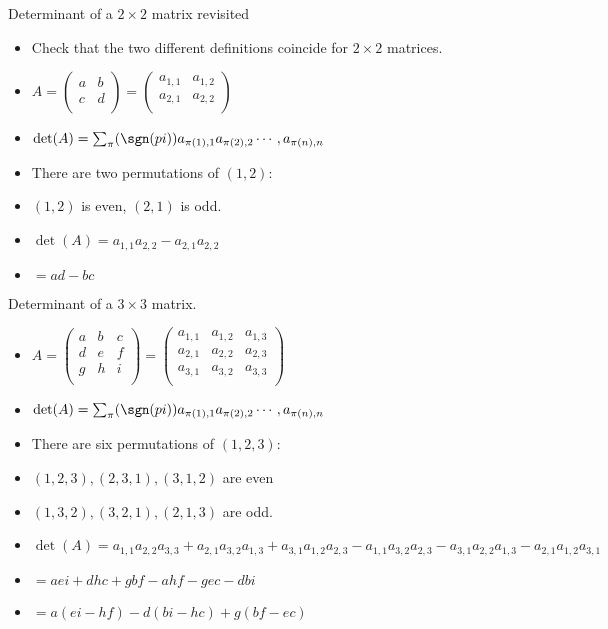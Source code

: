 \documentclass{beamer}
\begin{document}

\begin{frame}{Determinant of a $2\times 2$ matrix revisited}

\begin{itemize}
\item Check that the two different definitions coincide for $2\times 2$ matrices.
\item
$
A=
\begin{pmatrix}
a & b \\
c & d \\
\end{pmatrix}
=
\begin{pmatrix}
a_{1,1} & a_{1,2} \\
a_{2,1} & a_{2,2} \\
\end{pmatrix}
$
\item
$
\det(A) = \sum_{\pi} (\sgn(pi)) a_{\pi(1),1} a_{\pi(2), 2} \cdots, a_{\pi(n), n}
$
\item There are two permutations of $(1,2)$:
\item $(1,2)$ is even, $(2,1)$ is odd.
\item
$
\det(A) = a_{1,1}a_{2,2} - a_{2,1}a_{2,2}
$
\item $= ad-bc$
\end{itemize}
\end{frame}


\begin{frame}{Determinant of a $3\times 3$ matrix.}

\begin{itemize}
\item
$
A=
\begin{pmatrix}
a & b & c\\
d & e & f \\
g & h & i \\
\end{pmatrix}
=
\begin{pmatrix}
a_{1,1} & a_{1,2}  & a_{1,3}\\
a_{2,1} & a_{2,2}  & a_{2,3} \\
a_{3,1} & a_{3,2}  & a_{3,3} \\
\end{pmatrix}
$
\item
$
\det(A) = \sum_{\pi} (\sgn(pi)) a_{\pi(1),1} a_{\pi(2), 2} \cdots, a_{\pi(n), n}
$
\item There are six permutations of $(1,2,3)$:
\item $(1,2,3), (2,3,1), (3,1,2)$ are even
\item $(1,3,2), (3,2,1), (2,1,3)$ are odd.
\item
$
\det(A) = a_{1,1}a_{2,2}a_{3,3}  + a_{2,1}a_{3,2}a_{1,3} + a_{3,1}a_{1,2}a_{2,3}
-a_{1,1}a_{3,2}a_{2,3} -a_{3,1}a_{2,2}a_{1,3} - a_{2,1}a_{1,2}a_{3,1}
$
\item $= aei + dhc + gbf - ahf - gec - dbi$
\item $= a(ei - hf) - d(bi-hc) + g(bf -ec)$
\end{itemize}
\end{frame}
\end{document}
